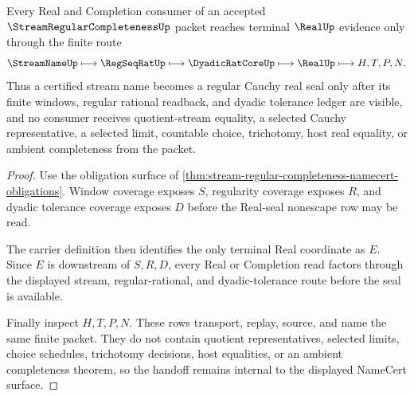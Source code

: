 \begin{theorem}
\label{thm:stream-regular-completeness-real-handoff}
Every Real and Completion consumer of an accepted $\StreamRegularCompletenessUp$ packet reaches terminal $\RealUp$ evidence only through the finite route
$$
\StreamNameUp \longmapsto \RegSeqRatUp \longmapsto \DyadicRatCoreUp \longmapsto \RealUp \longmapsto H,T,P,N .
$$
Thus a certified stream name becomes a regular Cauchy real seal only after its finite windows, regular rational readback, and dyadic tolerance ledger are visible, and no consumer receives quotient-stream equality, a selected Cauchy representative, a selected limit, countable choice, trichotomy, host real equality, or ambient completeness from the packet.
\end{theorem}
\begin{proof}
Use the obligation surface of \autoref{thm:stream-regular-completeness-namecert-obligations}. Window coverage exposes $S$, regularity coverage exposes $R$, and dyadic tolerance coverage exposes $D$ before the Real-seal nonescape row may be read.

The carrier definition then identifies the only terminal Real coordinate as $E$. Since $E$ is downstream of $S,R,D$, every Real or Completion read factors through the displayed stream, regular-rational, and dyadic-tolerance route before the seal is available.

Finally inspect $H,T,P,N$. These rows transport, replay, source, and name the same finite packet. They do not contain quotient representatives, selected limits, choice schedules, trichotomy decisions, host equalities, or an ambient completeness theorem, so the handoff remains internal to the displayed NameCert surface.
\end{proof}



